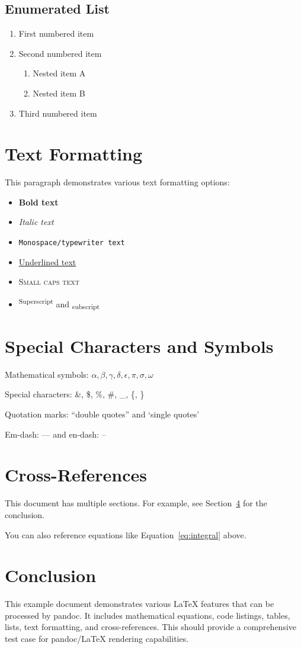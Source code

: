 \documentclass{article}
\begin{document}
\subsection{Enumerated List}
\begin{enumerate}
    \item First numbered item
    \item Second numbered item
        \begin{enumerate}
            \item Nested item A
            \item Nested item B
        \end{enumerate}
    \item Third numbered item
\end{enumerate}

\section{Text Formatting}

This paragraph demonstrates various text formatting options:
\begin{itemize}
    \item \textbf{Bold text}
    \item \textit{Italic text}
    \item \texttt{Monospace/typewriter text}
    \item \underline{Underlined text}
    \item \textsc{Small caps text}
    \item \textsuperscript{Superscript} and \textsubscript{subscript}
\end{itemize}

\section{Special Characters and Symbols}

Mathematical symbols: $\alpha, \beta, \gamma, \delta, \epsilon, \pi, \sigma, \omega$

Special characters: \&, \$, \%, \#, \_, \{, \}

Quotation marks: ``double quotes'' and `single quotes'

Em-dash: --- and en-dash: --

\section{Cross-References}

This document has multiple sections. For example, see Section~\ref{sec:conclusion} for the conclusion.

You can also reference equations like Equation~\eqref{eq:integral} above.

\section{Conclusion}
\label{sec:conclusion}

This example document demonstrates various LaTeX features that can be processed by pandoc. It includes mathematical equations, code listings, tables, lists, text formatting, and cross-references. This should provide a comprehensive test case for pandoc/LaTeX rendering capabilities.
\end{document}
